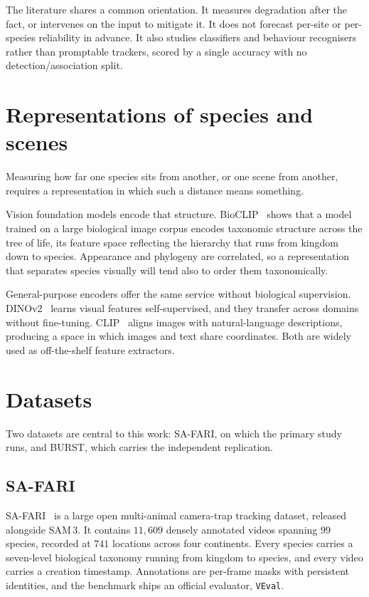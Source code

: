 The literature shares a common orientation. It measures degradation after the fact, or intervenes
on the input to mitigate it. It does not forecast per-site or per-species reliability in advance. It also
studies classifiers and behaviour recognisers rather than promptable trackers, scored by a single accuracy
with no detection/association split.

\section{Representations of species and scenes}
\label{sec:bg-representations}
Measuring how far one species sits from another, or one scene from another, requires a representation in
which such a distance means something.

Vision foundation models encode that structure. BioCLIP~\cite{bioclip} shows that a model trained
on a large biological image corpus encodes taxonomic structure across the tree of life, its feature space
reflecting the hierarchy that runs from kingdom down to species. Appearance and phylogeny are correlated, so
a representation that separates species visually will tend also to order them taxonomically.

General-purpose encoders offer the same service without biological supervision. DINOv2~\cite{dinov2} learns
visual features self-supervised, and they transfer across domains without fine-tuning. CLIP~\cite{clip}
aligns images with natural-language descriptions, producing a space in which images and text share
coordinates. Both are widely used as off-the-shelf feature extractors.

\section{Datasets}
\label{sec:bg-datasets}
Two datasets are central to this work: SA-FARI, on which the primary study runs, and BURST, which carries the
independent replication.

\subsection{SA-FARI}
\label{sec:bg-safari}
SA-FARI~\cite{safari} is a large open multi-animal camera-trap tracking dataset,
released alongside SAM\,3. It contains $11{,}609$ densely annotated videos spanning $99$ species, recorded at
$741$ locations across four continents. Every species carries a seven-level biological taxonomy running from
kingdom to species, and every video carries a creation timestamp. Annotations are per-frame masks with
persistent identities, and the benchmark ships an official evaluator, \texttt{VEval}.

